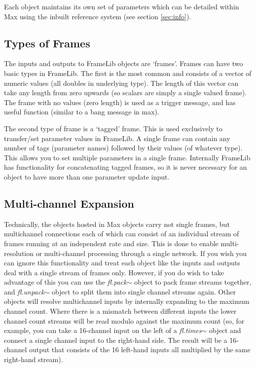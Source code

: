 \documentclass{article}
\newcommand{\flobject}[1]{\textit{fl.#1$\sim$}}
\begin{document}
Each object maintains its own set of parameters which can be detailed within Max using the inbuilt reference system (see section \ref{sec:info}).

\subsection{\label{sec:frametype}Types of Frames}

The inputs and outputs to FrameLib objects are `frames'. Frames can have two basic types in FrameLib. The first is the most common and consists of a vector of numeric values (all doubles in underlying type). The length of this vector can take any length from zero upwards (so scalars are simply a single valued frame). The frame with no values (zero length) is used as a trigger message, and has useful function (similar to a bang message in max). 

The second type of frame is a `tagged' frame. This is used exclusively to transfer/set parameter values in FrameLib. A single frame can contain any number of tags (parameter names) followed by their values (of whatever type). This allows you to set multiple parameters in a single frame. Internally FrameLib has functionality for concatenating tagged frames, so it is never necessary for an object to have more than one parameter update input.  

\subsection{Multi-channel Expansion}

Technically, the objects hosted in Max objects carry not single frames, but multichannel connections each of which can consist of an individual stream of frames running at an independent rate and size. This is done to enable multi-resolution or multi-channel processing through a single network. If you wish you can ignore this functionality and treat each object like the inputs and outputs deal with a single stream of frames only. However, if you do wish to take advantage of this you can use the \flobject{pack} object to pack frame streams together, and \flobject{unpack} object to split them into single channel streams again. Other objects will resolve multichannel inputs by internally expanding to the maximum channel count. Where there is a mismatch between different inputs the lower channel count streams will be read modulo against the maximum count (so, for example, you can take a 16-channel input on the left of a \flobject{times} object and connect a single channel input to the right-hand side. The result will be a 16-channel output that consists of the 16 left-hand inputs all multiplied by the same right-hand stream).
\pagebreak
\end{document}
